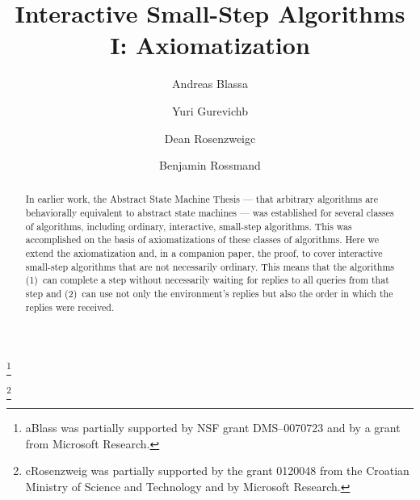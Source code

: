 \documentclass{LMCS}
\theoremstyle{definition}
\begin{document}
\title[Interactive Small-Step Algorithms I]{Interactive Small-Step
  Algorithms I: Axiomatization}

\author[A.~Blass]{Andreas Blass\rsuper a} 
\address{{\lsuper a}Mathematics Dept.,
  University of Michigan, Ann Arbor, MI 48109, U.S.A.}
\thanks{{\lsuper a}Blass was partially supported by NSF grant DMS--0070723 and by
  a grant from Microsoft Research.}

\author[Y.~Gurevich]{Yuri Gurevich\rsuper b}
\address{{\lsuper b}Microsoft Research, One Microsoft Way, Redmond, WA 98052,
U.S.A.}

\author[D.~Rosenzweig]{Dean Rosenzweig\rsuper c} 
\address{{\lsuper c}University of Zagreb, FSB, I. Lu\v ci\'ca 5, 10000 Zagreb,
  Croatia}
\thanks{{\lsuper c}Rosenzweig was partially supported by the grant 0120048 from
  the Croatian Ministry of Science and Technology and by Microsoft
  Research.} 

\author[B.~Rossman]{Benjamin Rossman\rsuper d}
\address{{\lsuper d}Computer Science Dept., M.I.T., Cambridge, MA 02139, U.S.A.}


\begin{abstract}
  In earlier work, the Abstract State Machine Thesis --- that
  arbitrary algorithms are behaviorally equivalent to abstract state
  machines --- was established for several classes of algorithms,
  including ordinary, interactive, small-step algorithms.  This was
  accomplished on the basis of axiomatizations of these classes of
  algorithms.  Here we extend the axiomatization and, in a companion
  paper, the proof, to cover interactive small-step algorithms that
  are not necessarily ordinary.  This means that the algorithms
  (1)~can complete a step without necessarily waiting for replies to
  all queries from that step and (2)~can use not only the
  environment's replies but also the order in which the replies were
  received.
\end{abstract}

\end{document}
